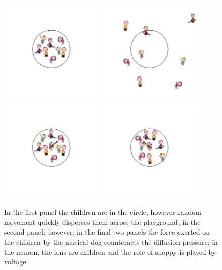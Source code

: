 \documentclass{article}
\begin{document}
\begin{figure}[tbph]
\begin{center}
  \includegraphics[width=5cm]{children1.png}
  \includegraphics[width=5cm]{children2.png}\\
  \includegraphics[width=5cm]{children3.png}
  \includegraphics[width=5cm]{children4.png}
\end{center}
\caption{In the first panel the children are in the circle, however
  random movement quickly disperses them across the playground, in the second panel;
  however, in the final two panels the force exerted on the children by the musical dog
  counteracts the diffusion pressure; in the neuron, the ions are
  children and the role of snoppy is played by
  voltage.\label{fig:children}}
\end{figure}
\end{document}
